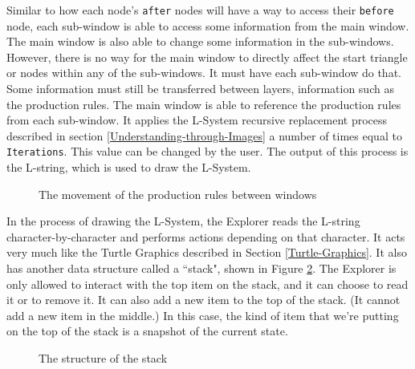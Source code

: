 \documentclass[12pt,twoside]{reedthesis}
\newcommand{\code}[1]{\texttt{#1}}
\begin{document}
	Similar to how each node's \code{after} nodes will have a way to access their \code{before} node, each sub-window is able to access some information from the main window. The main window is also able to change some information in the sub-windows. However, there is no way for the main window to directly affect the start triangle or nodes within any of the sub-windows. It must have each sub-window do that. Some information must still be transferred between layers, information such as the production rules. The main window is able to reference the production rules from each sub-window. It applies the L-System recursive replacement process described in section \ref{Understanding-through-Images} a number of times equal to \code{Iterations}. This value can be changed by the user. The output of this process is the L-string, which is used to draw the L-System.\\
	
	
	\begin{figure}[h]
	\centering
	\caption{The movement of the production rules between windows}
	\label {Strings}
	\end{figure}
	
	In the process of drawing the L-System, the Explorer reads the L-string character-by-character and performs actions depending on that character. It acts very much like the Turtle Graphics described in Section \ref{Turtle-Graphics}. It also has another data structure called a ``stack", shown in Figure \ref{Stack}. The Explorer is only allowed to interact with the top item on the stack, and it can choose to read it or to remove it. It can also add a new item to the top of the stack. (It cannot add a new item in the middle.) In this case, the kind of item that we're putting on the top of the stack is a snapshot of the current state.\\
	
	
	\begin{figure}[h]
	\centering
	\caption{The structure of the stack}
	\label {Stack}
	\end{figure}
	
\end{document}
